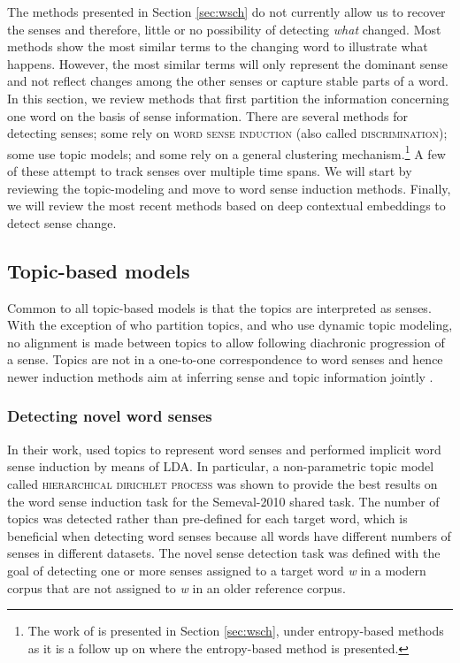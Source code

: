 \documentclass[output=paper]{langsci/langscibook}
\begin{document}
        The methods presented in Section \ref{sec:wsch}  do not currently allow us to recover the senses 
        and therefore, little or no possibility of detecting \emph{what} changed. Most methods show the most similar terms to the changing word to illustrate what happens. However, the most similar terms will only represent the dominant sense and not reflect changes among the other senses or capture stable parts of a word. 
        In this section, we review methods that first partition the information concerning one word on the basis of sense information. 
        There are several methods for detecting senses; some rely on \textsc{word sense induction} (also called \textsc{discrimination}); some use topic models; and some rely on a general clustering mechanism.\footnote{The work of \citet{tang2016} is presented in Section \ref{sec:wsch}, under entropy-based methods as it is a follow up on \citet{tang2013} where the entropy-based method is presented.} A few of these attempt to track senses over multiple time spans.          We will start by reviewing the topic-modeling and move to word sense induction methods. Finally, we will review the most recent methods based on deep contextual embeddings to detect sense change. 


\subsection{Topic-based models}\label{subs:topicmodels}
	Common to all topic-based models is that the topics are interpreted as senses. With the exception of \citet{wijaya2011understanding} who partition topics, and \citet{frermann-lapata-2016-bayesian} who use dynamic topic modeling, no alignment is made between topics to allow following diachronic progression of a sense.
	Topics are not in a one-to-one correspondence to word senses \citep{blei2006dynamic,topicsovertime} and hence newer induction methods aim at inferring sense and topic information jointly \citep{wang2015sense}. 

\subsubsection{Detecting novel word senses}    
In their work, \citet{lau-etal-2012-word} used topics to represent word senses and performed implicit word sense induction by means of LDA. In particular, a non-parametric topic model called \textsc{hierarchical dirichlet process} \citep{teh} was shown to provide the best results on the word sense induction task for the Semeval-2010 shared task.  The number of topics was detected rather than pre-defined for each target word, which is beneficial when detecting word senses because all words have different numbers of senses in different datasets.  
%
The novel sense detection task was defined with the goal of detecting one or more senses assigned to a target word \textit{w} in a modern corpus that are not assigned to \textit{w} in an older reference corpus.
\end{document}

